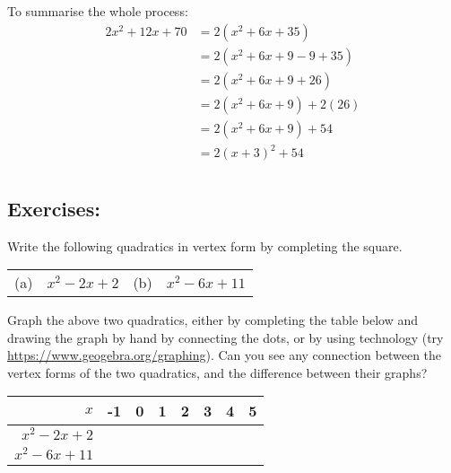 \documentclass[12pt]{article}
\begin{document}
To summarise the whole process:
\begin{align*}
2x^2 + 12x + 70 &= 2(x^2 + 6x + 35) \\
                &= 2(x^2 + 6x + 9 - 9 +35) \\
                &= 2(x^2 + 6x + 9 + 26) \\
                &= 2(x^2 + 6x + 9) + 2(26) \\
                &= 2(x^2 + 6x + 9) + 54 \\
                &= 2(x + 3)^2 + 54 \\
\end{align*}

\pagebreak
\subsection*{Exercises:}
Write the following quadratics in vertex form by completing the square. \\
\begin{center}
\begin{tabular}{rlrl}
(a) & $x^2 - 2x + 2$ & (b) & $x^2 - 6x + 11$ \\
\end{tabular}
\end{center}
Graph the above two quadratics, either by completing the table below and drawing the graph by hand by connecting the dots, or by using technology (try \url{https://www.geogebra.org/graphing}). Can you see any connection between the vertex forms of the two quadratics, and the difference between their graphs?

\begin{center}
\begin{tabular}{r|c|c|c|c|c|c|c}
$x$             &  -1 & 0 & 1 & 2 & 3 & 4 & 5 \\ \hline
$x^2 - 2x + 2$  &     &   &   &   &   &   &   \\ \hline
$x^2 - 6x + 11$ &     &   &   &   &   &   &   \\ 
\end{tabular}
\end{center}

\vspace{0.1cm}
\begin{center}
\end{center}
\end{document}
